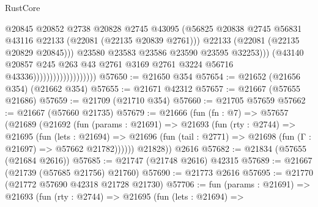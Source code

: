 \begin{lexlean}{RustCore}
\begin{coremodule}
                                                @20845
                                                @20852
                                                @2738
                                                @20828
                                                @2745
                                                @43095
                                                (@56825
                                                  @20838
                                                  @2745
                                                  @56831
                                                  @43116
                                                  @22133
                                                  (@22081 (@22135 @20839 @2761)))
                                                @22133
                                                (@22081 (@22135 @20829 @20845)))
                                              @23580
                                              @23583
                                              @23586
                                              @23590
                                              @23595
                                              @32253)))
                                        (@43140
                                          @20857
                                          @245
                                          @263
                                          @43
                                          @2761
                                          @3169
                                          @2761
                                          @3224
                                          @56716
                                          @43336)))))))))))))))))))
@57650 := @21650 @354
@57654 := @21652 (@21656 @354) (@21662 @354)
@57655 := @21671 @42312
@57657 := @21667 (@57655 @21686)
@57659 := @21709 (@21710 @354)
@57660 := @21705 @57659
@57662 := @21667 (@57660 @21735)
@57679 := @21666
    (fun (fn : @7) =>
    @57657
      (@21689
        (@21692
          (fun (params : @21691) =>
          @21693
            (fun (rty : @2744) =>
            @21695
              (fun (lets : @21694) =>
              @21696 (fun (tail : @2771) => @21698 (fun (Γ : @21697) => @57662 @21782))))))
        @21828))
    @2616
@57682 := @21834 (@57655 (@21684 @2616))
@57685 := @21747 (@21748 @2616) @42315
@57689 := @21667 (@21739 (@57685 @21756) @21760)
@57690 := @21773 @2616
@57695 := @21770 (@21772 @57690 @42318 @21728 @21730)
@57706 := fun (params : @21691) =>
  @21693
    (fun (rty : @2744) =>
    @21695
      (fun (lets : @21694) =>

\end{coremodule}
\end{lexlean}
